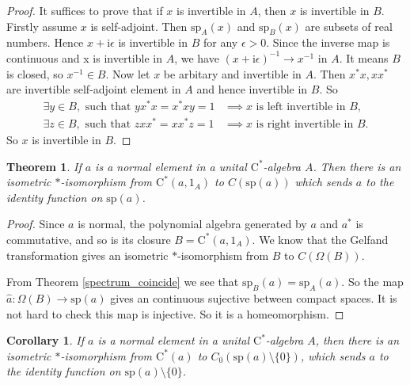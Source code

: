 \documentclass{article}
\newtheorem{theorem}{Theorem}[section]
\newtheorem{corollary}{Corollary}[section]
\begin{document}
\begin{proof}

It suffices to prove that if $x$ is invertible in $A$, then $x$ is invertible in $B$. Firstly assume $x$ is self-adjoint. Then $\text{sp}_A (x)$ and $\text{sp}_B (x)$ are subsets of real numbers. Hence $x + \mathrm{i} \epsilon$ is invertible in $B$ for any $\epsilon >0$. Since the inverse map is continuous and x is invertible in $A$, we have
$(x + \mathrm{i} \epsilon)^{-1} \to x^{-1}$ in $A$. It means $B$ is closed, so $x^{-1} \in B$.
Now let $x$ be arbitary and invertible in $A$. Then $ x^* x, xx^*$ are invertible self-adjoint element in $A$ and hence invertible in $B$. So
\begin{align*}
\exists y \in B , \text{ such that } yx^*x = x^* x y = 1 & \implies x \text{ is left invertible in } B,\\
\exists z \in B , \text{ such that } zxx^*  = xx^* z = 1 & \implies x \text{ is right invertible in } B.
\end{align*}
So $x$ is invertible in $B$.
\end{proof}


\begin{theorem}
If $a$ is a normal element in a unital $\mathrm{C}^*$-algebra $A$. Then there is an isometric $*$-isomorphism from $\mathrm{C}^* (a,1_A)$ to $C(\text{sp}(a))$ which sends $a$ to the identity function on $\text{sp}(a)$.
\end{theorem}

\begin{proof}
Since $a$ is normal, the polynomial algebra generated by $a$ and $a^*$ is commutative, and so is its closure $B = \mathrm{C}^* (a,1_A)$. We know that the Gelfand transformation gives an isometric $*$-isomorphism from $B$ to $C(\Omega(B))$.

From Theorem \ref{spectrum_coincide} we see that $\text{sp}_B(a) = \text{sp}_A (a)$. So the map $\hat{a}: \Omega(B) \to \text{sp}(a)$ gives an continuous sujective between compact spaces. It is not hard to check this map is injective. So it is a homeomorphism.
\end{proof}


\begin{corollary}
If $a$ is a normal element in a unital $\mathrm{C}^*$-algebra $A$, then there is an isometric $*$-isomorphism from $\mathrm{C}^* (a)$ to $C_0 (\text{sp}(a) \setminus \{ 0 \})$, which sends $a$ to the identity function on $\text{sp}(a) \setminus \{ 0 \}$.
\end{corollary}
\end{document}
